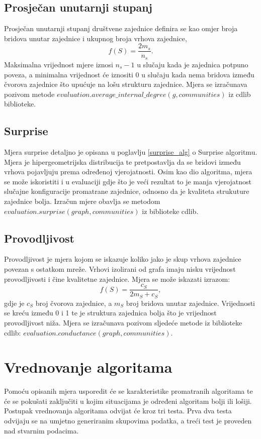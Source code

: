 \pagebreak
\subsection{Prosječan unutarnji stupanj}
Prosječan unutarnji stupanj društvene zajednice definira se kao omjer broja bridova unutar zajednice i ukupnog broja vrhova zajednice,
\begin{equation}
	f(S) =  \frac{2m_{s}}{n_{s}}.
\end{equation}
Maksimalna vrijednost mjere iznosi $n_{s} - 1$ u slučaju kada je zajednica potpuno poveza, a minimalna vrijednost će iznositi 0 u slučaju kada nema bridova između čvorova zajednice što upućuje na lošu strukturu zajednice. Mjera se izračunava pozivom metode $evaluation.average\_internal\_degree(g,communities)$ iz cdlib biblioteke.


\subsection{Surprise}
Mjera surprise detaljno je opisana u poglavlju \ref{surprise_alg} o Surprise algoritmu. Mjera je hipergeometrijska distribucija te pretpostavlja da se bridovi između vrhova pojavljuju prema određenoj vjerojatnosti. Osim kao dio algoritma, mjera se može iskoristiti i u evaluaciji gdje što je veći rezultat to je manja vjerojatnost slučajne konfiguracije promatrane zajednice, odnosno da je kvaliteta strukuture zajednice bolja. Izračun mjere obavlja se metodom $evaluation.surprise(graph, communities)$ iz biblioteke cdlib.


\subsection{Provodljivost}
Provodljivost je mjera kojom se iskazuje koliko jako je skup vrhova zajednice povezan s ostatkom mreže. Vrhovi izolirani od grafa imaju nisku vrijednost provodljivosti i čine kvalitetne zajednice. Mjera se može iskazati izrazom:
\begin{equation}
	f(S) = \frac{c_{S}}{2m_{S} + c_{S}},
\end{equation}
gdje je $c_{S}$ broj čvorova zajednice, a $m_{S}$ broj bridova unutar zajednice. Vrijednosti se kreću između 0 i 1 te je struktura zajednica bolja što je vrijednost provodljivost niža. Mjera se izračunava pozivom sljedeće metode iz biblioteke cdlib: $evaluation.conductance(graph, communities)$.


\pagebreak
\section{Vrednovanje algoritama}
Pomoću opisanih mjera usporedit će se karakteristike promatranih algoritama te će se pokušati zaključiti u kojim situacijama je određeni algoritam bolji ili lošiji. Postupak vrednovanja algoritama odvijat će kroz tri testa.  Prva dva testa odvijaju se na umjetno generiranim skupovima podatka, a treći test je proveden nad stvarnim podacima.

